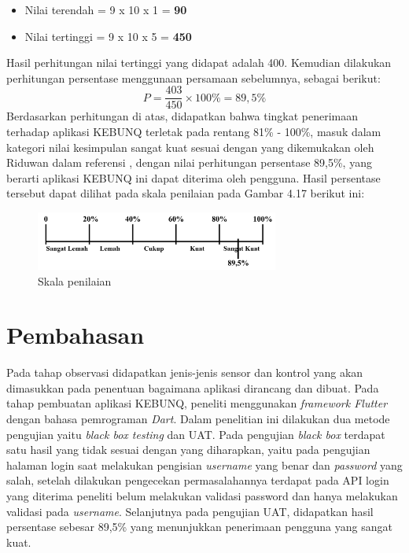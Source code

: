 \begin{flushleft}
\begin{justify}
\begin{itemize}
                \item Nilai terendah = 9 x 10 x 1 = \textbf{90}
                \item Nilai tertinggi = 9 x 10 x 5 = \textbf{450}
             \end{itemize}
             Hasil perhitungan nilai tertinggi yang didapat adalah 400. Kemudian dilakukan perhitungan persentase menggunaan persamaan sebelumnya, sebagai berikut:
             \begin{equation}
                P = \frac{403}{450} \times 100\% = 89,5\%
             \end{equation}
             Berdasarkan perhitungan di atas, didapatkan bahwa tingkat penerimaan terhadap aplikasi KEBUNQ terletak pada rentang 81\% - 100\%, 
             masuk dalam kategori nilai kesimpulan sangat kuat sesuai dengan yang dikemukakan oleh Riduwan dalam referensi \cite{kuantitatif}, dengan nilai perhitungan persentase
             89,5\%, yang berarti aplikasi KEBUNQ ini dapat diterima oleh pengguna. Hasil persentase tersebut dapat dilihat pada skala penilaian pada Gambar 4.17 berikut ini:
             \begin{figure}[ht]
                \centering
                \includegraphics[width=8cm]{images/bab 4/persentase.png}
                \caption{Skala penilaian}
            \end{figure}


   
        \section{Pembahasan}
        Pada tahap observasi didapatkan jenis-jenis sensor dan kontrol yang akan dimasukkan pada penentuan bagaimana aplikasi dirancang dan dibuat. Pada tahap pembuatan aplikasi KEBUNQ, peneliti menggunakan \emph{framework Flutter} dengan bahasa pemrograman \emph{Dart}. Dalam penelitian ini dilakukan dua metode pengujian yaitu \emph{black box testing} dan UAT. Pada pengujian \emph{black box} terdapat satu hasil yang tidak sesuai dengan yang diharapkan, yaitu pada
        pengujian halaman login saat melakukan pengisian \emph{username} yang benar dan \emph{password} yang salah, setelah dilakukan pengecekan permasalahannya terdapat pada API login yang diterima peneliti 
        belum melakukan validasi password dan hanya melakukan validasi pada \emph{username}. Selanjutnya pada pengujian UAT, didapatkan hasil persentase sebesar 89,5\% yang menunjukkan penerimaan pengguna yang sangat kuat.
         


\end{justify}
\end{flushleft}
